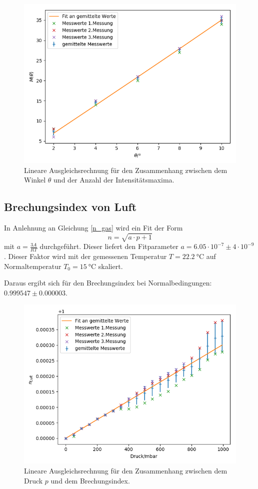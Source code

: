 \begin{figure}[h]
\centering
\includegraphics[width=\linewidth]{img/n_glas.png}
\caption{Lineare Ausgleichsrechnung für den Zusammenhang zwischen dem Winkel $\theta$ und der Anzahl
der Intensitätsmaxima.}
\label{n_glas}
\end{figure}

\subsection{Brechungsindex von Luft}

In Anlehnung an Gleichung \ref{n_gas} wird ein Fit der Form
\[
n = \sqrt{a \cdot p + 1}
\]
mit $a = \frac{3A}{RT}$ durchgeführt. Dieser liefert den Fitparameter
$a = 6.05 \cdot 10^{-7} \pm 4 \cdot 10^{-9}$. Dieser Faktor wird mit der gemessenen Temperatur
$T = \SI{22.2}{\degreeCelsius}$ auf Normaltemperatur $T_0 = \SI{15}{\degreeCelsius}$ skaliert.

Daraus ergibt sich für den Brechungsindex bei Normalbedingungen: $0.999547 \pm 0.000003$.

\begin{figure}[h]
\centering
\includegraphics[width=\linewidth]{img/n_luft.png}
\caption{Lineare Ausgleichsrechnung für den Zusammenhang zwischen dem Druck $p$ und dem Brechungsindex.}
\label{n_luft}
\end{figure}

